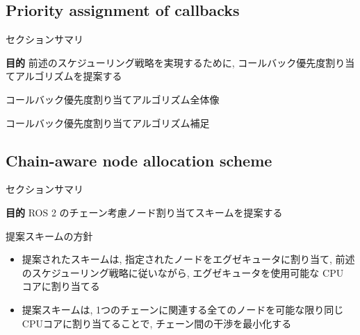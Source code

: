 \subsection{Priority assignment of callbacks}
\label{ssec: priority assignment of callbacks}

\begin{frame}{セクションサマリ}
    \begin{itembox}[l]{\textbf{目的}}
        前述のスケジューリング戦略を実現するために, コールバック優先度割り当てアルゴリズムを提案する
    \end{itembox}
\end{frame}

\begin{frame}{コールバック優先度割り当てアルゴリズム全体像}
\end{frame}

\begin{frame}[label=alg1]{コールバック優先度割り当てアルゴリズム補足}
\end{frame}


\subsection{Chain-aware node allocation scheme}
\label{ssec: chain-aware node allocation scheme}

\begin{frame}{セクションサマリ}
    \begin{itembox}[l]{\textbf{目的}}
        ROS 2 のチェーン考慮ノード割り当てスキームを提案する
    \end{itembox}
\end{frame}

\begin{frame}{提案スキームの方針}
    \begin{itemize}
        \item 提案されたスキームは, 指定されたノードをエグゼキュータに割り当て, 前述のスケジューリング戦略に従いながら, エグゼキュータを使用可能な CPU コアに割り当てる
        \item 提案スキームは, 1つのチェーンに関連する全てのノードを可能な限り同じCPUコアに割り当てることで, チェーン間の干渉を最小化する
    \end{itemize}
\end{frame}


